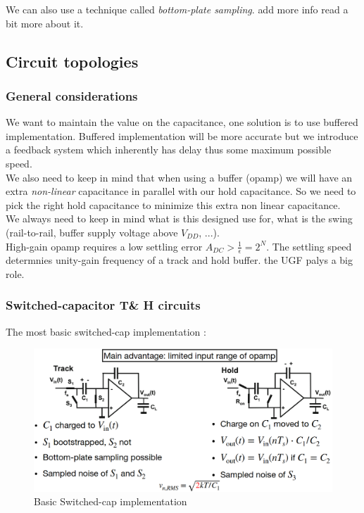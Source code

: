 \documentclass[
  a4paper,
]{article}
\begin{document}
We can also use a technique called \emph{bottom-plate sampling}. {add
more info read a bit more about it}.

\hypertarget{circuit-topologies}{%
\subsection{Circuit topologies}\label{circuit-topologies}}

\hypertarget{general-considerations}{%
\subsubsection{General considerations}\label{general-considerations}}

We want to maintain the value on the capacitance, one solution is to use
buffered implementation. Buffered implementation will be more accurate
but we introduce a feedback system which inherently has delay thus some
maximum possible speed.\\
We also need to keep in mind that when using a buffer (opamp) we will
have an extra \emph{non-linear} capacitance in parallel with our hold
capacitance. So we need to pick the right hold capacitance to minimize
this extra non linear capacitance.\\
We always need to keep in mind what is this designed use for, what is
the swing (rail-to-rail, buffer supply voltage above \(V_{DD}\), ...).\\
High-gain opamp requires a low settling error
\(A_{DC} > \frac{1}{\epsilon} = 2^N\). The settling speed determnies
unity-gain frequency of a track and hold buffer. the UGF palys a big
role.

\hypertarget{switched-capacitor-t-h-circuits}{%
\subsubsection{Switched-capacitor T\& H
circuits}\label{switched-capacitor-t-h-circuits}}

The most basic switched-cap implementation :

\begin{figure}
\hypertarget{fig:basic-sc-label}{%
\centering
\includegraphics{img/basic_th_switched_cap.png}
\caption{Basic Switched-cap implementation}\label{fig:basic-sc-label}
}
\end{figure}
\end{document}
